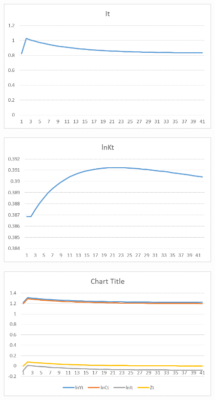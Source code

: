 \documentclass{amsart}
\theoremstyle{plain}
\begin{document}
\begin{figure}[H]
\includegraphics[scale=.50]{12d.png}
\end{figure}
\begin{figure}[H]
\includegraphics[scale=.50]{12e.png}
\end{figure}
\begin{figure}[H]
\includegraphics[scale=.50]{12f.png}
\end{figure}
\end{document}
